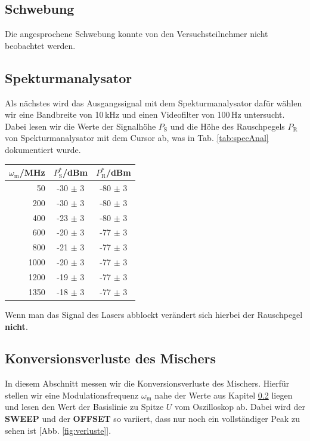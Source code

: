 \subsection{Schwebung}
\label{sub:schewbung}

Die angesprochene Schwebung konnte von den Versuchsteilnehmer nicht beobachtet werden.

\subsection{Spekturmanalysator}
\label{sub:specAnal}

Als nächstes wird das Ausgangssignal mit dem Spekturmanalysator dafür wählen wir eine Bandbreite von 10\,kHz und einen Videofilter von 100\,Hz untersucht. Dabei lesen wir die Werte der Signalhöhe $P_\mathrm{S}$ und die Höhe des Rauschpegels $P_\mathrm{R}$ von Spekturmanalysator mit dem Cursor ab, was in Tab. \ref{tab:specAnal} dokumentiert wurde.
\begin{center}
    \captionsetup{type=table}
    \begin{tabular}{r | c c}
        $\omega_\mathrm{m}$/MHz & $P^*_\mathrm{S}$/dBm & $P^*_\mathrm{R}$/dBm \\ \hline
        50   & -30 $\pm$ 3 & -80 $\pm$ 3 \\
        200  & -30 $\pm$ 3 & -80 $\pm$ 3 \\
        400  & -23 $\pm$ 3 & -80 $\pm$ 3 \\
        600  & -20 $\pm$ 3 & -77 $\pm$ 3 \\
        800  & -21 $\pm$ 3 & -77 $\pm$ 3 \\
        1000 & -20 $\pm$ 3 & -77 $\pm$ 3 \\
        1200 & -19 $\pm$ 3 & -77 $\pm$ 3 \\
        1350 & -18 $\pm$ 3 & -77 $\pm$ 3 \\
    \end{tabular}
    \label{tab:specAnal}
\end{center}
Wenn man das Signal des Lasers abblockt verändert sich hierbei der Rauschpegel \textbf{nicht}.

\newpage

\subsection{Konversionsverluste des Mischers}
\label{sub:verluste}

In diesem Abschnitt messen wir die Konversionsverluste des Mischers. Hierfür stellen wir eine Modulationsfrequenz $\omega_\mathrm{m}$ nahe der Werte aus Kapitel \ref{sub:specAnal} liegen und lesen den Wert der Basislinie zu Spitze $U$ vom Oszilloskop ab. Dabei wird der \textbf{SWEEP} und der \textbf{OFFSET} so variiert, dass nur noch ein vollständiger Peak zu sehen ist [Abb. \ref{fig:verluste}].

